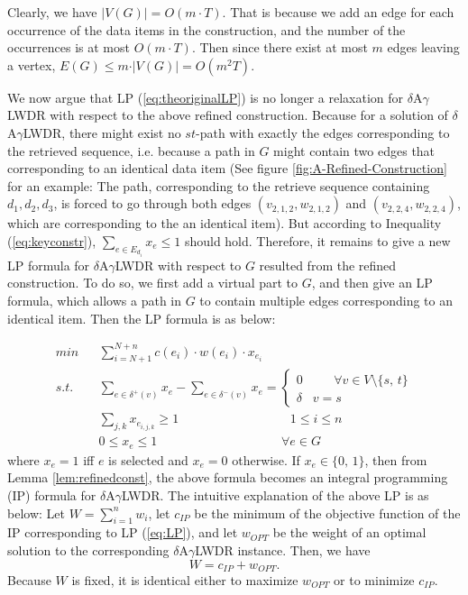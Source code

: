 \documentclass[11pt,english,onecolumn,draftcls]{IEEEtran}
\theoremstyle{plain}
\theoremstyle{plain}
\theoremstyle{plain}
\theoremstyle{plain}
\begin{document}
\begin{IEEEproof}
Clearly, we have $\vert V(G)\vert=O(m\cdot T)$. That is because we
add an edge for each occurrence of the data items in the construction,
and the number of the occurrences is at most $O(m\cdot T)$. Then
since there exist at most $m$ edges leaving a vertex, $E(G)\leq m\cdot\vert V(G)\vert=O(m^{2}T)$.
\end{IEEEproof}
We now argue that LP (\ref{eq:theoriginalLP}) is no longer a relaxation
for $\delta$A$\gamma$LWDR with respect to the above refined construction.
Because for a solution of $\delta$A$\gamma$LWDR, there might exist
no $st$-path with exactly the edges corresponding to the retrieved
sequence, i.e. because a path in $G$ might contain two edges that
corresponding to an identical data item (See figure \ref{fig:A-Refined-Construction}
for an example: The path, corresponding to the retrieve sequence containing
$d_{1},d_{2},d_{3}$, is forced to go through both edges $(v_{2,1,2},w_{2,1,2})$
and $(v_{2,2,4},w_{2,2,4})$, which are corresponding to the an identical
item). But according to Inequality (\ref{eq:keyconstr}), $\sum_{e\in E_{d_{i}}}x_{e}\leq1$
should hold. Therefore, it remains to give a new LP formula for $\delta$A$\gamma$LWDR
with respect to $G$ resulted from the refined construction. To do
so, we first add a virtual part to $G$, and then give an LP formula,
which allows a path in $G$ to contain multiple edges corresponding
to an identical item. Then the LP formula is as below:

\begin{eqnarray}
min &  & \sum_{i=N+1}^{N+n}c(e_{i})\cdot w(e_{i})\cdotp x_{e_{i}}\label{eq:thedualLP}\\
s.t. &  & \sum_{e\in\delta^{+}(v)}x_{e}-\sum_{e\in\delta^{-}(v)}x_{e}=\left\{ \begin{array}{cc}
0 & \mbox{ }\quad\forall v\in V\setminus\{s,\, t\}\\
\delta & v=s
\end{array}\right.\label{eq:refinedLPflow}\\
 &  & \sum_{j,k}x_{e_{i,j,k}}\geq1\,\quad\quad\quad\quad\quad\quad\quad\quad\mbox{ }1\leq i\leq n\\
 &  & 0\leq x_{e}\leq1\,\quad\quad\quad\quad\quad\quad\quad\quad\quad\mbox{ }\forall e\in G\label{eq:x_ebetween01}
\end{eqnarray}
where $x_{e}=1$ iff $e$ is selected and $x_{e}=0$ otherwise. If
$x_{e}\in\{0,\,1\}$, then from Lemma \ref{lem:refinedconst}, the
above formula becomes an integral programming (IP) formula for $\delta$A$\gamma$LWDR.
The intuitive explanation of the above LP is as below: Let $W=\sum_{i=1}^{n}w_{i}$,
let $c_{IP}$ be the minimum of the objective function of the IP corresponding
to LP (\ref{eq:LP}), and let $w_{OPT}$ be the weight of an optimal
solution to the corresponding $\delta$A$\gamma$LWDR instance. Then,
we have
\begin{equation}
W=c_{IP}+w_{OPT}.\label{eq:w-1}
\end{equation}
Because $W$ is fixed, it is identical either to maximize $w_{OPT}$
or to minimize $c_{IP}$.
\end{document}
